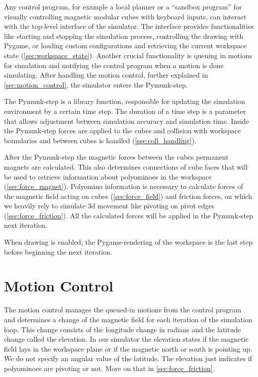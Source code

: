 Any control program, for example a local planner or a ``sandbox program'' for visually controlling magnetic modular cubes with keyboard inputs, can interact with the top-level interface of the simulator.
The interface provides functionalities like starting and stopping the simulation process, controlling the drawing with Pygame, or loading custom configurations and retrieving the current workspace state (\autoref{sec:workspace_state}).
Another crucial functionality is queuing in motions for simulation and notifying the control program when a motion is done simulating.
After handling the motion control, further explained in \autoref{sec:motion_control}, the simulator enters the Pymunk-step.

The Pymunk-step is a library function, responsible for updating the simulation environment by a certain time step.
The duration of a time step is a parameter that allows adjustment between simulation accuracy and simulation time. 
Inside the Pymunk-step forces are applied to the cubes and collision with workspace boundaries and between cubes is handled (\autoref{sec:coll_handling}).

After the Pymunk-step the magnetic forces between the cubes permanent magnets are calculated.
This also determines connections of cube faces that will be used to retrieve information about polyominoes in the workspace (\autoref{sec:force_magnet}).
Polyomino information is necessary to calculate forces of the magnetic field acting on cubes (\autoref{sec:force_field}) and friction forces, on which we heavily rely to simulate 3d movement like pivoting on pivot edges (\autoref{sec:force_friction}).
All the calculated forces will be applied in the Pymunk-step next iteration.

When drawing is enabled, the Pygame-rendering of the workspace is the last step before beginning the next iteration.


\section{Motion Control}
\label{sec:motion_control}

The motion control manages the queued-in motions from the control program and determines a change of the magnetic field for each iteration of the simulation loop.
This change consists of the longitude change in radians and the latitude change called the elevation.
In our simulator the elevation states if the magnetic field lays in the workspace plane or if the magnetic north or south is pointing up.
We do not specify an angular value of the latitude.
The elevation just indicates if polyominoes are pivoting or not.
More on that in \autoref{sec:force_friction}.

